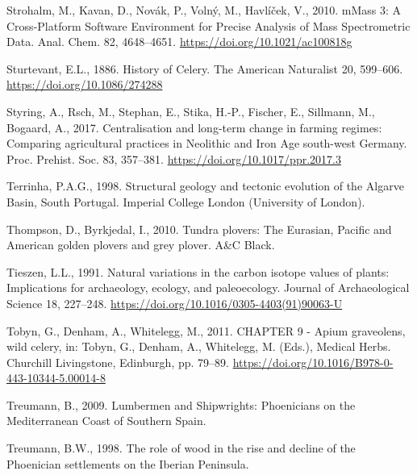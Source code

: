 \documentclass[preprint, 3p, authoryear]{elsarticle} %
\newlength{\cslhangindent}
\newlength{\cslentryspacingunit} %
\newenvironment{CSLReferences}[2] %
 {%
  \setlength{\parindent}{0pt}
  \ifodd #1
  \let\oldpar\par
  \def\par{\hangindent=\cslhangindent\oldpar}
  \fi
  \setlength{\parskip}{#2\cslentryspacingunit}
 }%
 {}
\begin{document}
\begin{CSLReferences}{1}{0}
\leavevmode{}%
Strohalm, M., Kavan, D., Novák, P., Volný, M., Havlíček, V., 2010. {mMass} 3: A {Cross}-{Platform Software Environment} for {Precise Analysis} of {Mass Spectrometric Data}. Anal. Chem. 82, 4648--4651. \url{https://doi.org/10.1021/ac100818g}

\leavevmode{}%
Sturtevant, E.L., 1886. History of {Celery}. The American Naturalist 20, 599--606. \url{https://doi.org/10.1086/274288}

\leavevmode{}%
Styring, A., Rsch, M., Stephan, E., Stika, H.-P., Fischer, E., Sillmann, M., Bogaard, A., 2017. Centralisation and long-term change in farming regimes: Comparing agricultural practices in {Neolithic} and {Iron Age} south-west {Germany}. Proc. Prehist. Soc. 83, 357--381. \url{https://doi.org/10.1017/ppr.2017.3}

\leavevmode{}%
Terrinha, P.A.G., 1998. Structural geology and tectonic evolution of the {Algarve Basin}, {South Portugal}. {Imperial College London (University of London)}.

\leavevmode{}%
Thompson, D., Byrkjedal, I., 2010. Tundra plovers: The {Eurasian}, {Pacific} and {American} golden plovers and grey plover. {A\&C Black}.

\leavevmode{}%
Tieszen, L.L., 1991. Natural variations in the carbon isotope values of plants: {Implications} for archaeology, ecology, and paleoecology. Journal of Archaeological Science 18, 227--248. \url{https://doi.org/10.1016/0305-4403(91)90063-U}

\leavevmode{}%
Tobyn, G., Denham, A., Whitelegg, M., 2011. {CHAPTER} 9 - {Apium} graveolens, wild celery, in: Tobyn, G., Denham, A., Whitelegg, M. (Eds.), Medical {Herbs}. {Churchill Livingstone}, {Edinburgh}, pp. 79--89. \url{https://doi.org/10.1016/B978-0-443-10344-5.00014-8}

\leavevmode{}%
Treumann, B., 2009. Lumbermen and {Shipwrights}: {Phoenicians} on the {Mediterranean Coast} of {Southern Spain}.

\leavevmode{}%
Treumann, B.W., 1998. The role of wood in the rise and decline of the {Phoenician} settlements on the {Iberian Peninsula}.


\end{CSLReferences}
\end{document}
